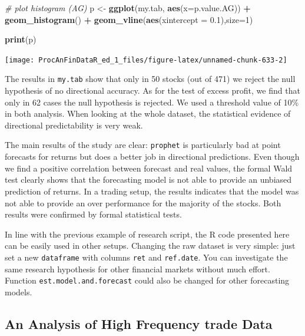 \documentclass[11pt,]{book}
\newenvironment{Shaded}{\begin{snugshade}}{\end{snugshade}}
\newcommand{\KeywordTok}[1]{\textcolor[rgb]{0.27,0.27,0.27}{\textbf{#1}}}
\newcommand{\DataTypeTok}[1]{\textcolor[rgb]{0.27,0.27,0.27}{#1}}
\newcommand{\DecValTok}[1]{\textcolor[rgb]{0.06,0.06,0.06}{#1}}
\newcommand{\FloatTok}[1]{\textcolor[rgb]{0.06,0.06,0.06}{#1}}
\newcommand{\StringTok}[1]{\textcolor[rgb]{0.5,0.5,0.5}{#1}}
\newcommand{\CommentTok}[1]{\textcolor[rgb]{0.56,0.35,0.01}{\textit{#1}}}
\newcommand{\OperatorTok}[1]{\textcolor[rgb]{0.81,0.36,0.00}{\textbf{#1}}}
\newcommand{\NormalTok}[1]{#1}
\begin{document}
\begin{Shaded}
\begin{Highlighting}[]
\CommentTok{# plot histogram (AG)}
\NormalTok{p <-}\StringTok{ }\KeywordTok{ggplot}\NormalTok{(my.tab, }\KeywordTok{aes}\NormalTok{(}\DataTypeTok{x=}\NormalTok{p.value.AG)) }\OperatorTok{+}\StringTok{ }
\StringTok{    }\KeywordTok{geom_histogram}\NormalTok{() }\OperatorTok{+}\StringTok{ }
\StringTok{    }\KeywordTok{geom_vline}\NormalTok{(}\KeywordTok{aes}\NormalTok{(}\DataTypeTok{xintercept =}  \FloatTok{0.1}\NormalTok{),}\DataTypeTok{size=}\DecValTok{1}\NormalTok{)}

\KeywordTok{print}\NormalTok{(p)    }
\end{Highlighting}
\end{Shaded}

\begin{center}\texttt{[image: ProcAnFinDataR\_ed\_1\_files/figure-latex/unnamed-chunk-633-2]} \end{center}

The results in \texttt{my.tab} show that only in 50 stocks (out of 471)
we reject the null hypothesis of no directional accuracy. As for the
test of excess profit, we find that only in 62 cases the null hypothesis
is rejected. We used a threshold value of 10\% in both analysis. When
looking at the whole dataset, the statistical evidence of directional
predictability is very weak.

The main results of the study are clear: \texttt{prophet} is
particularly bad at point forecasts for returns but does a better job in
directional predictions. Even though we find a positive correlation
between forecast and real values, the formal Wald test clearly shows
that the forecasting model is not able to provide an unbiased prediction
of returns. In a trading setup, the results indicates that the model was
not able to provide an over performance for the majority of the stocks.
Both results were confirmed by formal statistical tests.

In line with the previous example of research script, the R code
presented here can be easily used in other setups. Changing the raw
dataset is very simple: just set a new \texttt{dataframe} with columns
\texttt{ret} and \texttt{ref.date}. You can investigate the same
research hypothesis for other financial markets without much effort.
Function \texttt{est.model.and.forecast} could also be changed for other
forecasting models.

\subsection{An Analysis of High Frequency trade
Data}\label{research-gethfdata}
\end{document}
